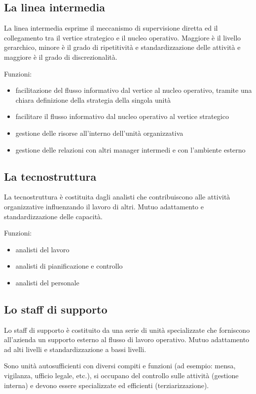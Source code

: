 \subsection{La linea intermedia}
La linea intermedia esprime il meccanismo di supervisione
diretta ed il collegamento tra il vertice strategico e il nucleo
operativo. Maggiore è il livello gerarchico, minore è il grado di ripetitività e
standardizzazione delle attività e maggiore è il grado di
discrezionalità.

Funzioni:
\begin{itemize}
	\item facilitazione del flusso informativo dal vertice al nucleo operativo,
	tramite una chiara definizione della strategia della singola unità
	\item facilitare il flusso informativo dal nucleo operativo al vertice strategico
	\item gestione delle risorse all’interno dell’unità organizzativa
	\item gestione delle relazioni con altri manager intermedi e con l’ambiente
	esterno
\end{itemize}

\subsection{La tecnostruttura}
La tecnostruttura è costituita dagli analisti che
contribuiscono alle attività organizzative influenzando il
lavoro di altri.
Mutuo adattamento e standardizzazione delle capacità.

Funzioni:
\begin{itemize}
	\item analisti del lavoro
	\item analisti di pianificazione e controllo
	\item analisti del personale
\end{itemize}

\subsection{Lo staff di supporto}
Lo staff di supporto è costituito da una serie di unità
specializzate che forniscono all'azienda un supporto
esterno al flusso di lavoro operativo.
Mutuo adattamento ad alti livelli e standardizzazione a
bassi livelli.

Sono unità autosufficienti con diversi compiti e funzioni
(ad esempio: mensa, vigilanza, ufficio legale, etc.), si occupano del
controllo sulle attività
(gestione interna)
e devono essere specializzate ed efficienti (terziarizzazione).

